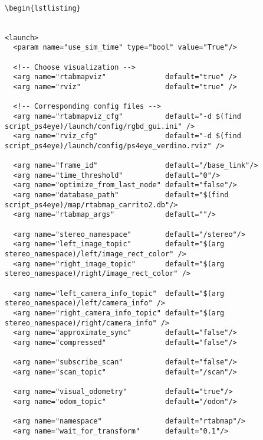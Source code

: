 
\begin{center}
\begin{footnotesize}
\begin{verbatim}
  
\begin{lstlisting}


<launch>
  <param name="use_sim_time" type="bool" value="True"/>
 
  <!-- Choose visualization -->
  <arg name="rtabmapviz"              default="true" />
  <arg name="rviz"                    default="true" />
  
  <!-- Corresponding config files -->
  <arg name="rtabmapviz_cfg"          default="-d $(find script_ps4eye)/launch/config/rgbd_gui.ini" />
  <arg name="rviz_cfg"                default="-d $(find script_ps4eye)/launch/config/ps4eye_verdino.rviz" />
  
  <arg name="frame_id"                default="/base_link"/>
  <arg name="time_threshold"          default="0"/>
  <arg name="optimize_from_last_node" default="false"/>
  <arg name="database_path"           default="$(find script_ps4eye)/map/rtabmap_carrito2.db"/>
  <arg name="rtabmap_args"            default=""/>

  <arg name="stereo_namespace"        default="/stereo"/>
  <arg name="left_image_topic"        default="$(arg stereo_namespace)/left/image_rect_color" />
  <arg name="right_image_topic"       default="$(arg stereo_namespace)/right/image_rect_color" />

  <arg name="left_camera_info_topic"  default="$(arg stereo_namespace)/left/camera_info" />
  <arg name="right_camera_info_topic" default="$(arg stereo_namespace)/right/camera_info" />
  <arg name="approximate_sync"        default="false"/>
  <arg name="compressed"              default="false"/>
   
  <arg name="subscribe_scan"          default="false"/>
  <arg name="scan_topic"              default="/scan"/>
   
  <arg name="visual_odometry"         default="true"/>
  <arg name="odom_topic"              default="/odom"/>
  
  <arg name="namespace"               default="rtabmap"/>
  <arg name="wait_for_transform"      default="0.1"/>
  

\end{verbatim}
\end{footnotesize}
\end{center}
